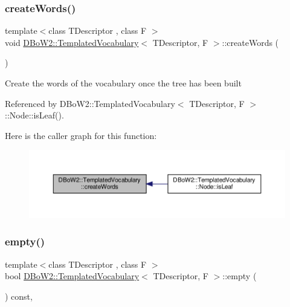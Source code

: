 \subsubsection{\texorpdfstring{create\+Words()}{createWords()}}
{\footnotesize\ttfamily template$<$class T\+Descriptor , class F $>$ \\
void \hyperlink{classDBoW2_1_1TemplatedVocabulary}{D\+Bo\+W2\+::\+Templated\+Vocabulary}$<$ T\+Descriptor, F $>$\+::create\+Words (\begin{DoxyParamCaption}{ }\end{DoxyParamCaption})\hspace{0.3cm}{\ttfamily [protected]}}

Create the words of the vocabulary once the tree has been built 

Referenced by D\+Bo\+W2\+::\+Templated\+Vocabulary$<$ T\+Descriptor, F $>$\+::\+Node\+::is\+Leaf().

Here is the caller graph for this function\+:\nopagebreak
\begin{figure}[H]
\begin{center}
\leavevmode
\includegraphics[width=350pt]{classDBoW2_1_1TemplatedVocabulary_a9b74d107b7dc6142cbed4e6ef44a8519_icgraph}
\end{center}
\end{figure}
\mbox{\label{classDBoW2_1_1TemplatedVocabulary_ad7bbb3cf53f8f9f3610b9b67c551ba8e}} 
\subsubsection{\texorpdfstring{empty()}{empty()}}
{\footnotesize\ttfamily template$<$class T\+Descriptor , class F $>$ \\
bool \hyperlink{classDBoW2_1_1TemplatedVocabulary}{D\+Bo\+W2\+::\+Templated\+Vocabulary}$<$ T\+Descriptor, F $>$\+::empty (\begin{DoxyParamCaption}{ }\end{DoxyParamCaption}) const\hspace{0.3cm}{\ttfamily [inline]}, {\ttfamily [virtual]}}

